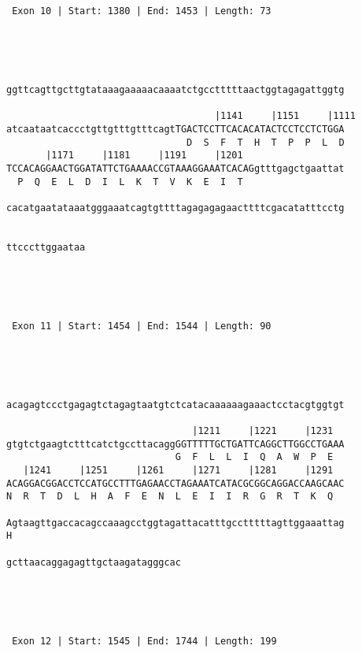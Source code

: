 \documentclass{article}
\begin{document}
\begin{Verbatim}
 Exon 10 | Start: 1380 | End: 1453 | Length: 73 




                                                            
ggttcagttgcttgtataaagaaaaacaaaatctgcctttttaactggtagagattggtg
                                                            
                                     |1141     |1151     |1111
atcaataatcaccctgttgtttgtttcagtTGACTCCTTCACACATACTCCTCCTCTGGA
                                D  S  F  T  H  T  P  P  L  D
       |1171     |1181     |1191     |1201                  
TCCACAGGAACTGGATATTCTGAAAACCGTAAAGGAAATCACAGgtttgagctgaattat
  P  Q  E  L  D  I  L  K  T  V  K  E  I  T                  
                                                            
cacatgaatataaatgggaaatcagtgttttagagagagaacttttcgacatatttcctg
                                                            
              
ttcccttggaataa
              




 Exon 11 | Start: 1454 | End: 1544 | Length: 90 




                                                            
acagagtccctgagagtctagagtaatgtctcatacaaaaaagaaactcctacgtggtgt
                                                            
                                 |1211     |1221     |1231  
gtgtctgaagtctttcatctgccttacaggGGTTTTTGCTGATTCAGGCTTGGCCTGAAA
                              G  F  L  L  I  Q  A  W  P  E  
   |1241     |1251     |1261     |1271     |1281     |1291  
ACAGGACGGACCTCCATGCCTTTGAGAACCTAGAAATCATACGCGGCAGGACCAAGCAAC
N  R  T  D  L  H  A  F  E  N  L  E  I  I  R  G  R  T  K  Q  
                                                            
Agtaagttgaccacagccaaagcctggtagattacatttgcctttttagttggaaattag
H                                                           
                               
gcttaacaggagagttgctaagatagggcac
                               




 Exon 12 | Start: 1545 | End: 1744 | Length: 199 





\end{Verbatim}
\end{document}
